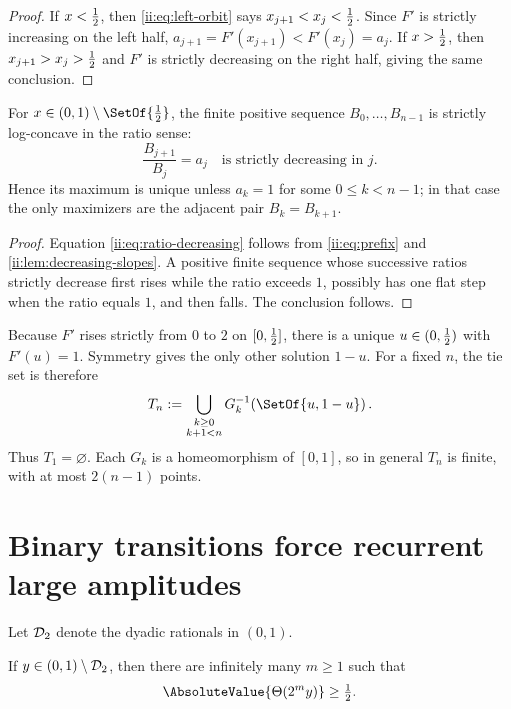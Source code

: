 \begin{proof}
If $x<\tfrac12$, then \eqref{ii:eq:left-orbit} says $x_{j+1}<x_j<\tfrac12$.  Since $F'$ is
strictly increasing on the left half, $a_{j+1}=F'(x_{j+1})<F'(x_j)=a_j$.
If $x>\tfrac12$, then $x_{j+1}>x_j>\tfrac12$ and $F'$ is strictly decreasing on the right
half, giving the same conclusion.
\end{proof}

\begin{lemma}
\label{ii:lem:prefix-unimodal}
For $x\in(0,1)\setminus\SetOf{\half}$, the finite positive sequence
$B_0,\ldots,B_{n-1}$ is strictly log-concave in the ratio sense:
\begin{equation}
 \frac{B_{j+1}}{B_j}=a_j
 \quad\text{is strictly decreasing in }j.
 \label{ii:eq:ratio-decreasing}
\end{equation}
Hence its maximum is unique unless $a_k=1$ for some $0\leq k<n-1$; in that case the
only maximizers are the adjacent pair $B_k=B_{k+1}$.
\end{lemma}

\begin{proof}
Equation \eqref{ii:eq:ratio-decreasing} follows from \eqref{ii:eq:prefix} and
\cref{ii:lem:decreasing-slopes}.  A positive finite sequence whose successive ratios
strictly decrease first rises while the ratio exceeds $1$, possibly has one flat step
when the ratio equals $1$, and then falls.  The conclusion follows.
\end{proof}

Because $F'$ rises strictly from $0$ to $2$ on $[0,\tfrac12]$, there is a unique
$u\in(0,\tfrac12)$ with $F'(u)=1$.  Symmetry gives the only other solution $1-u$.
For a fixed $n$, the tie set is therefore
\begin{equation}
 T_n:=\bigcup_{\substack{k\geq0\\k+1<n}}
 G_k^{-1}\!\left(\SetOf{u,1-u}\right).
 \label{ii:eq:tie-set}
\end{equation}
Thus $T_1=\varnothing$.  Each $G_k$ is a homeomorphism of $[0,1]$, so in
general $T_n$ is finite, with at most $2(n-1)$ points.

\section{Binary transitions force recurrent large amplitudes}
\label{ii:sec:binary}

Let $\mathcal D_2$ denote the dyadic rationals in $(0,1)$.

\begin{lemma}
\label{ii:lem:binary-transition}
If $y\in(0,1)\setminus\mathcal D_2$, then there are infinitely many $m\geq1$ such that
\begin{equation}
 \AbsoluteValue{\ThetaF(2^m y)}\geq\half.
 \label{ii:eq:theta-recurrence}
\end{equation}
\end{lemma}

